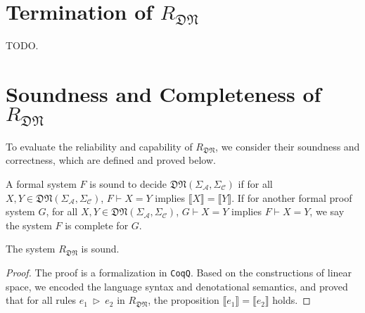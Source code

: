 \documentclass[manuscript, review, timestamp]{acmart}
\newcommand*{\fst}{\texttt{fst}}
\newcommand*{\snd}{\texttt{snd}}
\newcommand*{\reduce}{\ \triangleright\ }
\newcommand*{\sem}[1]{\llbracket #1 \rrbracket}
\begin{document}



\section{Termination of $R_\mathfrak{DN}$}

TODO.

\section{Soundness and Completeness of $R_\mathfrak{DN}$}

To evaluate the reliability and capability of $R_\mathfrak{DN}$, we consider their soundness and correctness, which are defined and proved below.

\begin{definition}
  A formal system $F$ is sound to decide $\mathfrak{DN}(\Sigma_\mathcal{A}, \Sigma_\mathcal{C})$ if for all $X, Y \in \mathfrak{DN}(\Sigma_\mathcal{A}, \Sigma_\mathcal{C})$, $F \vdash X = Y$ implies $\sem{X} = \sem{Y}$. If for another formal proof system $G$, for all $X, Y \in \mathfrak{DN}(\Sigma_\mathcal{A}, \Sigma_\mathcal{C})$, $G \vdash X = Y$ implies $F \vdash X = Y$, we say the system $F$ is complete for $G$.
\end{definition}

\begin{lemma}
  The system $R_\mathfrak{DN}$ is sound.
\end{lemma}
\begin{proof}
  The proof is a formalization in \texttt{CoqQ}. Based on the constructions of linear space, we encoded the language syntax and denotational semantics, and proved that for all rules $e_1 \reduce e_2$ in $R_\mathfrak{DN}$, the proposition $\sem{e_1} = \sem{e_2}$ holds.
\end{proof}
\end{document}

